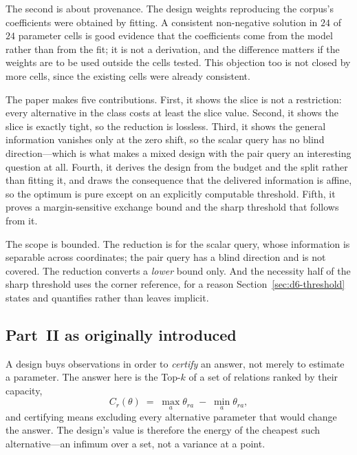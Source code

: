 \documentclass[conference]{IEEEtran}
\theoremstyle{definition}
\begin{document}
The second is about provenance. The design weights reproducing the corpus's coefficients were
obtained by fitting. A consistent non-negative solution in $24$ of $24$ parameter cells is
good evidence that the coefficients come from the model rather than from the fit; it is not a
derivation, and the difference matters if the weights are to be used outside the cells
tested. This objection too is not closed by more cells, since the existing cells were already
consistent.

The paper makes five contributions. First, it shows the slice is not a restriction: every
alternative in the class costs at least the slice value. Second, it shows the slice is exactly
tight, so the reduction is lossless. Third, it shows the general information vanishes only at
the zero shift, so the scalar query has no blind direction---which is what makes a mixed
design with the pair query an interesting question at all. Fourth, it derives the design from
the budget and the split rather than fitting it, and draws the consequence that the delivered
information is affine, so the optimum is pure except on an explicitly computable threshold.
Fifth, it proves a margin-sensitive exchange bound and the sharp threshold that follows from
it.

The scope is bounded. The reduction is for the scalar query, whose information is separable
across coordinates; the pair query has a blind direction and is not covered. The reduction
converts a \emph{lower} bound only. And the necessity half of the sharp threshold uses the
corner reference, for a reason Section~\ref{sec:d6-threshold} states and quantifies rather than
leaves implicit.


\subsection{Part~II as originally introduced}


A design buys observations in order to \emph{certify} an answer, not merely to estimate a
parameter. The answer here is the Top-$k$ of a set of relations ranked by their capacity,
\begin{equation}
C_{r}(\theta)\;=\;\max_{a}\theta_{ra}\;-\;\min_{a}\theta_{ra},
\label{eq:fn-capacity}
\end{equation}
and certifying means excluding every alternative parameter that would change the answer. The
design's value is therefore the energy of the cheapest such alternative---an infimum over a
set, not a variance at a point.
\end{document}
